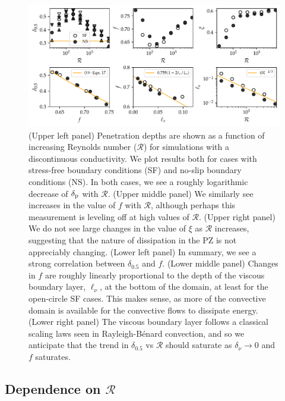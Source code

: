 \documentclass[twocolumn]{aastex631}
\newcommand{\delp}{\ensuremath{\delta_{\rm{p}}}}
\newcommand{\mR}{\ensuremath{\mathcal{R}}}
\begin{document}
\begin{figure}[t]
\centering
\includegraphics[width=\textwidth]{parameters_vs_re.pdf}
\caption{
(Upper left panel) Penetration depths are shown as a function of increasing Reynolds number ($\mR$) for simulations with a discontinuous conductivity.
We plot results both for cases with stress-free boundary conditions (SF) and no-slip boundary conditions (NS).
In both cases, we see a roughly logarithmic decrease of $\delp$ with $\mR$.
(Upper middle panel) We similarly see increases in the value of $f$ with $\mR$, although perhaps this measurement is leveling off at high values of $\mR$.
(Upper right panel) We do not see large changes in the value of $\xi$ as $\mR$ increases, suggesting that the nature of dissipation in the PZ is not appreciably changing.
(Lower left panel) In summary, we see a strong correlation between $\delta_{0.5}$ and $f$.
(Lower middle panel) Changes in $f$ are roughly linearly proportional to the depth of the viscous boundary layer, $\ell_\nu$, at the bottom of the domain, at least for the open-circle SF cases.
This makes sense, as more of the convective domain is available for the convective flows to dissipate energy.
(Lower right panel) The viscous boundary layer follows a classical scaling laws seen in Rayleigh-B\'{e}nard convection, and so we anticipate that the trend in $\delta_{0.5}$ vs $\mR$ should saturate as $\delta_{\nu} \rightarrow 0$ and $f$ saturates.
\label{fig:parameters_vs_re}
}
\end{figure}





\subsection{Dependence on $\mR$}
\end{document}
